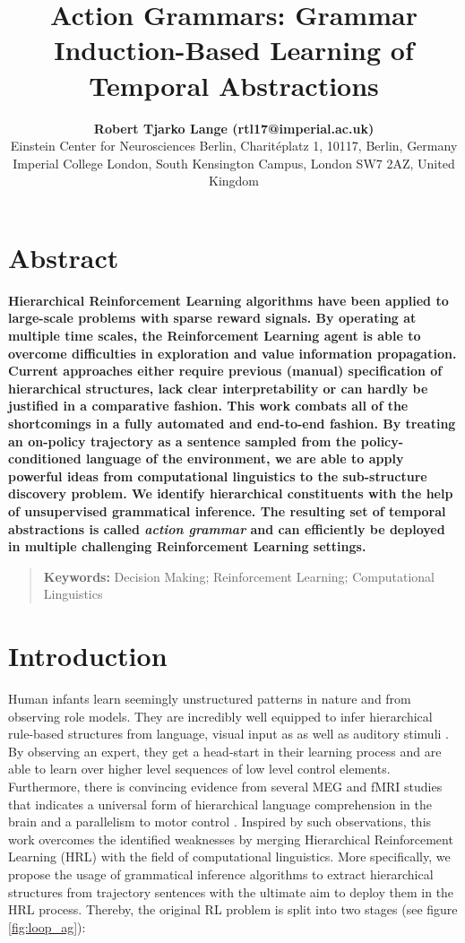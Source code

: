 \documentclass[10pt,letterpaper]{article}
\title{Action Grammars: Grammar Induction-Based Learning of Temporal Abstractions}
\author{{\large \bf Robert Tjarko Lange (rtl17@imperial.ac.uk)} \\
  Einstein Center for Neurosciences Berlin, Charitéplatz 1, 10117, Berlin, Germany \AND {\large \bf Aldo Faisal (a.faisal@imperial.ac.uk)} \\
  Imperial College London, South Kensington Campus, London SW7 2AZ, United Kingdom}
\begin{document}
\maketitle


\section{Abstract}
{
\bf
Hierarchical Reinforcement Learning algorithms have been applied to large-scale problems with sparse reward signals. By operating at multiple time scales, the Reinforcement Learning agent is able to overcome difficulties in exploration and value information propagation. Current approaches either require previous (manual) specification of hierarchical structures, lack clear interpretability or can hardly be justified in a comparative fashion.
This work combats all of the shortcomings in a fully automated and end-to-end fashion. By treating an on-policy trajectory as a sentence sampled from the policy-conditioned language of the environment, we are able to apply powerful ideas from computational linguistics to the sub-structure discovery problem.
We identify hierarchical constituents with the help of unsupervised grammatical inference. The resulting set of temporal abstractions is called \textit{action grammar} and can efficiently be deployed in multiple challenging Reinforcement Learning settings.
}
\begin{quote}
\small
\textbf{Keywords:} 
Decision Making; Reinforcement Learning; Computational Linguistics
\end{quote}

\section{Introduction}

Human infants learn seemingly unstructured patterns in nature and from observing role models. They are incredibly well equipped to infer hierarchical rule-based structures from language, visual input as as well as auditory stimuli \cite{Frank_2009, Marcus_2007}. By observing an expert, they get a head-start in their learning process and are able to learn over higher level sequences of low level control elements. Furthermore, there is convincing evidence from several MEG and fMRI studies that indicates a universal form of hierarchical language comprehension in the brain \cite{Frank_2018, Brennan_2016, Nelson_2017} and a parallelism to motor control \cite{Pastra_2012, Stout_2018}.
Inspired by such observations, this work overcomes the identified weaknesses by merging Hierarchical Reinforcement Learning (HRL) with the field of computational linguistics. More specifically, we propose the usage of grammatical inference algorithms to extract hierarchical structures from trajectory sentences with the ultimate aim to deploy them in the HRL process. Thereby, the original RL problem is split into two stages (see figure \ref{fig:loop_ag}):
\end{document}
